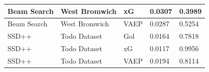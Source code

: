 \documentclass{beamer}
\begin{document}
\begin{frame}
\begin{table}[H]
\begin{tabular}{|l|l|l|l|l|}
            \\
            \hline
            Beam Search & West Bromwich & xG & 0.0307 & 0.3989 
            \\
            \hline
            Beam Search & West Bromwich & VAEP & 0.0287 & 0.5254 
            \\
            \hline
            SSD++ & Todo Dataset & Gol & 0.0164 & 0.7818 
            \\
            \hline
            SSD++ & Todo Dataset & xG & 0.0117 & 0.9956
            \\
            \hline
            SSD++ & Todo Dataset & VAEP & 0.0194 & 0.8114
            \\
            \hline
        \end{tabular}
        \label{tab:resultMetricas}
    \end{table}
\end{frame}
\end{document}
